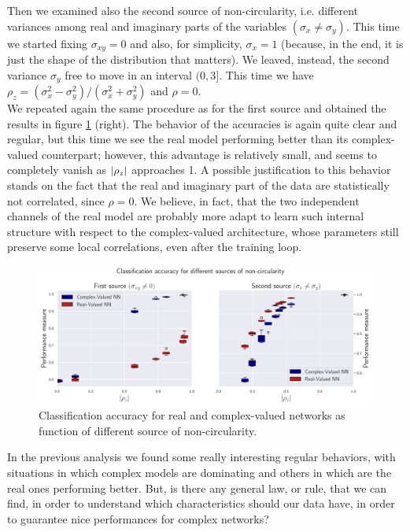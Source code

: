 \documentclass[../main.tex]{subfiles}
\begin{document}
Then we examined also the second source of non-circularity, i.e. different variances among real and imaginary parts of the variables $(\sigma_x\neq\sigma_y)$. This time we started fixing $\sigma_{xy}=0$ and also, for simplicity, $\sigma_x=1$ (because, in the end, it is just the shape of the distribution that matters). We leaved, instead, the second variance $\sigma_y$ free to move in an interval $(0, 3]$. This time we have $\rho_z= (\sigma_x^2-\sigma_y^2)/ (\sigma_x^2+\sigma_y^2)$ and $\rho=0$.\\
We repeated again the same procedure as for the first source and obtained the results in figure \ref{fig:noncirc_results} (right). The behavior of the accuracies is again quite clear and regular, but this time we see the real model performing better than its complex-valued counterpart; however, this advantage is relatively small, and seems to completely vanish as $\abs{\rho_z}$ approaches 1. A possible justification to this behavior stands on the fact that the real and imaginary part of the data are statistically not correlated, since $\rho=0$. We believe, in fact, that the two independent channels of the real model are probably more adapt to learn such internal structure with respect to the complex-valued architecture, whose parameters still preserve some local correlations, even after the training loop.\\
\begin{figure}[!ht]
	\centering
	\includegraphics[width=\textwidth]{pictures/noncirc_results}
	\caption{Classification accuracy for real and complex-valued networks as function of different source of non-circularity.}
	\label{fig:noncirc_results}
\end{figure}
In the previous analysis we found some really interesting regular behaviors, with situations in which complex models are dominating and others in which are the real ones performing better. But, is there any general law, or rule, that we can find, in order to understand which characteristics should our data have, in order to guarantee nice performances for complex networks?\\
\end{document}
